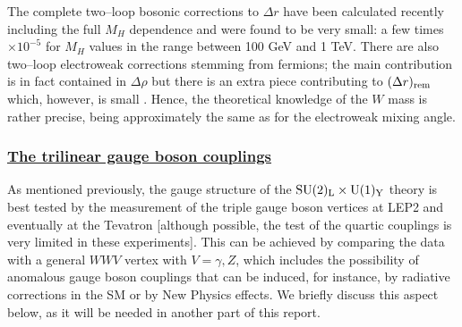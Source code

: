 The complete two--loop bosonic corrections to $\Delta r$ have been calculated
recently \cite{EW-2loop} including the full $M_H$ dependence and were found to
be very small: a few times  $\times 10^{-5}$ for $M_H$ values in the range
between  100 GeV and 1 TeV. There are also two--loop electroweak corrections
stemming from  fermions; the main contribution is in fact contained in $\Delta
\rho$ but there is an extra piece contributing to $(\Delta r)_{\rm rem}$ which,
however, is small \cite{rho-2loopEW3,Paolo-approach}. Hence, the theoretical
knowledge of the $W$ mass is rather precise, being approximately the same as 
for the electroweak mixing angle.  


\subsubsection*{\underline{The trilinear gauge boson couplings}}

As mentioned previously, the gauge structure of the ${\rm SU(2)_L\times
U(1)_Y}$ theory is best tested by the measurement of the triple gauge boson
vertices at LEP2 and eventually at the Tevatron [although possible, the test of
the quartic couplings is very limited in these experiments]. This can be
achieved by comparing the data with a general $WWV$ vertex with $V=\gamma,Z$,
which includes the possibility of anomalous gauge boson couplings that can be
induced, for instance, by radiative corrections in the SM or by New Physics
effects. We briefly discuss this aspect below, as it will be needed in another
part of this report.\s 

